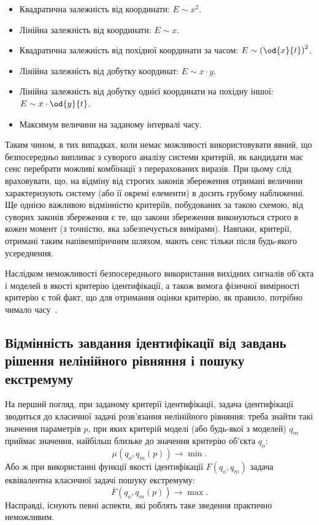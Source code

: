 \begin{itemize}

  \item
    Квадратична залежність від координати:
    $E \sim x^2$.

  \item
    Лінійна залежність від координати:
    $E \sim x$.

  \item
    Квадратична залежність від похідної координати за часом:
    $E \sim \left( \od{x}{t}\right)^2$.

  \item
    Лінійна залежність від добутку координат:
    $E \sim x \cdot y$.

  \item
    Лінійна залежність від добутку однієї координати на похідну іншої:
    $E \sim x \cdot \od{y}{t}$.

  \item
  Максимум величини на заданому інтервалі часу.

\end{itemize}

Таким чином, в тих випадках, коли немає можливості
використовувати явний, що безпосередньо випливає з суворого
аналізу системи критерій, як кандидати має сенс перебрати
можливі комбінації з перерахованих виразів. При цьому слід
враховувати, що, на відміну від строгих законів збереження
отримані величини характеризують систему (або її окремі
елементи) в досить грубому наближенні. Ще однією важливою
відмінністю критеріїв, побудованих за такою схемою, від суворих
законів збереження є те, що закони збереження виконуються строго
в кожен момент (з точністю, яка забезпечується вимірами). Навпаки,
критерії, отримані таким напівемпіричним шляхом, мають сенс
тільки після будь-якого усереднення.

Наслідком неможливості безпосереднього використання вихідних
сигналів об'єкта і моделей в якості критерію ідентифікації,
а також вимога фізичної вимірності критерію є той факт, що
для отримання оцінки критерію, як правило, потрібно чимало
часу~\cite{atu_ich2011, atu_DSMP2016}.



\subsection{Відмінність завдання ідентифікації від завдань рішення нелінійного рівняння і пошуку екстремуму} %

На перший погляд, при заданому критерії ідентифікації, задача ідентифікації
зводиться до класичної задачі розв'язання нелінійного рівняння: треба знайти
такі значення параметрів $p$, при яких критерій моделі (або будь-якої з
моделей) $q_m$ приймає значення, найбільш близьке до значення критерію
об'єкта $q_o$:
\[
  \mu( q_o, q_m(p) ) \to \min.
\]
%
Або ж при використанні функції якості ідентифікації
$ F (q_o, q_m) $ задача еквівалентна класичної задачі пошуку
екстремуму:
%
\[
  \overline{F}( q_o, q_m(p) ) \to \max.
\]
%
Насправді, існують певні аспекти, які роблять таке зведення практично
неможливим.

